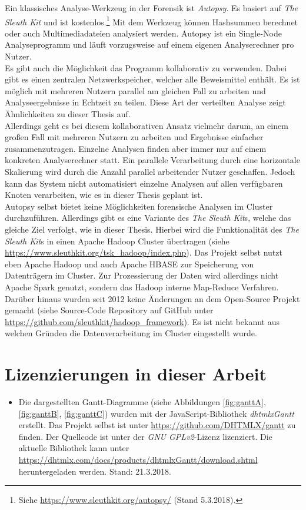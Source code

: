 \noindent
Ein klassisches Analyse-Werkzeug in der Forensik ist \textit{Autopsy}. Es basiert auf \textit{The Sleuth Kit} und ist kostenlos.\footnote{Siehe \url{https://www.sleuthkit.org/autopsy/} (Stand 5.3.2018).} Mit dem Werkzeug können Hashsummen berechnet oder auch Multimediadateien analysiert werden. Autopsy ist ein Single-Node Analyseprogramm und läuft vorzugsweise auf einem eigenen Analyserechner pro Nutzer.\\ 
Es gibt auch die Möglichkeit das Programm kollaborativ zu verwenden. Dabei gibt es einen zentralen Netzwerkspeicher, welcher alle Beweismittel enthält. Es ist möglich mit mehreren Nutzern parallel am gleichen Fall zu arbeiten und Analyseergebnisse in Echtzeit zu teilen. Diese Art der verteilten Analyse zeigt Ähnlichkeiten zu dieser Thesis auf.\\
Allerdings geht es bei diesem kollaborativen Ansatz vielmehr darum, an einem großen Fall mit mehreren Nutzern zu arbeiten und Ergebnisse einfacher zusammenzutragen. Einzelne Analysen finden aber immer nur auf einem konkreten Analyserechner statt. Ein parallele Verarbeitung durch eine horizontale Skalierung wird durch die Anzahl parallel arbeitender Nutzer geschaffen. Jedoch kann das System nicht automatisiert einzelne Analysen auf allen verfügbaren Knoten verarbeiten, wie es in dieser Thesis geplant ist.\\

\noindent
Autopsy selbst bietet keine Möglichkeiten forensische Analysen im Cluster durchzuführen. Allerdings gibt es eine Variante des \textit{The Sleuth Kit}s, welche das gleiche Ziel verfolgt, wie in dieser Thesis. Hierbei wird die Funktionalität des \textit{The Sleuth Kit}s in einen Apache Hadoop Cluster übertragen (siehe \url{https://www.sleuthkit.org/tsk_hadoop/index.php}). Das Projekt selbst nutzt eben Apache Hadoop und auch Apache HBASE zur Speicherung von Datenträgern im Cluster. Zur Prozessierung der Daten wird allerdings nicht Apache Spark genutzt, sondern das Hadoop interne Map-Reduce Verfahren. Darüber hinaus wurden seit 2012 keine Änderungen an dem Open-Source Projekt gemacht (siehe Source-Code Repository auf GitHub unter \url{https://github.com/sleuthkit/hadoop_framework}). Es ist nicht bekannt aus welchen Gründen die Datenverarbeitung im Cluster eingestellt wurde.

\section{Lizenzierungen in dieser Arbeit}
\label{sec:licencing_issues}
\begin{itemize}
\item Die dargestellten Gantt-Diagramme (siehe Abbildungen \ref{fig:ganttA}, \ref{fig:ganttB}, \ref{fig:ganttC}) wurden mit der JavaScript-Bibliothek \textit{dhtmlxGantt} erstellt. Das Projekt selbst ist unter \url{https://github.com/DHTMLX/gantt} zu finden. Der Quellcode ist unter der \textit{GNU GPLv2}-Lizenz lizenziert. Die aktuelle Bibliothek kann unter \url{https://dhtmlx.com/docs/products/dhtmlxGantt/download.shtml} heruntergeladen werden. Stand: 21.3.2018.
\end{itemize}

